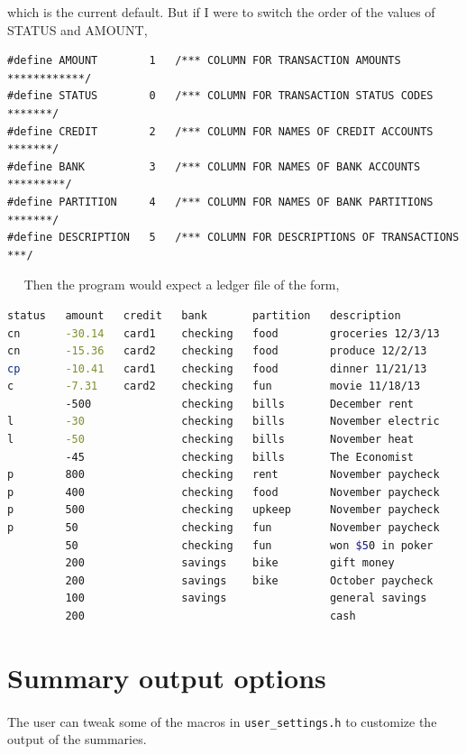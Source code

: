 \documentclass{article}
\providecommand{\q}{$\quad$ \newline}
\begin{document}
\begin{flushleft}
which is the current default. But if I were to switch the order of the values of STATUS and AMOUNT, 

\begin{lstlisting}
#define AMOUNT        1   /*** COLUMN FOR TRANSACTION AMOUNTS ************/
#define STATUS        0   /*** COLUMN FOR TRANSACTION STATUS CODES *******/
#define CREDIT        2   /*** COLUMN FOR NAMES OF CREDIT ACCOUNTS *******/
#define BANK          3   /*** COLUMN FOR NAMES OF BANK ACCOUNTS *********/       
#define PARTITION     4   /*** COLUMN FOR NAMES OF BANK PARTITIONS *******/
#define DESCRIPTION   5   /*** COLUMN FOR DESCRIPTIONS OF TRANSACTIONS ***/
\end{lstlisting} 

\q 
Then the program would expect a ledger file of the form,\q

\begin{lstlisting}[language=bash]
status   amount   credit   bank       partition   description
cn       -30.14   card1    checking   food        groceries 12/3/13
cn       -15.36   card2    checking   food        produce 12/2/13
cp       -10.41   card1    checking   food        dinner 11/21/13
c        -7.31    card2    checking   fun         movie 11/18/13
         -500              checking   bills       December rent
l        -30               checking   bills       November electric
l        -50               checking   bills       November heat
         -45               checking   bills       The Economist
p        800               checking   rent        November paycheck		
p        400               checking   food        November paycheck	
p        500               checking   upkeep      November paycheck		
p        50                checking   fun         November paycheck	
         50                checking   fun         won $50 in poker		
         200               savings    bike        gift money
         200               savings    bike        October paycheck
         100               savings                general savings
         200                                      cash
\end{lstlisting}




\section{Summary output options}

\paragraph{} The user can tweak some of the macros in {\tt user\_settings.h} to customize the output of the summaries.


\end{flushleft}
\end{document}
